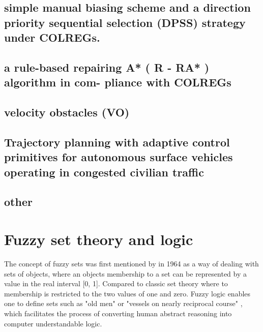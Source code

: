 \subsection{simple manual biasing scheme and a direction priority sequential selection (DPSS) strategy under COLREGs. }\cite{naeem2012colregs}
\subsection{ a rule-based repairing A* ( R - RA* ) algorithm in com-
    pliance with COLREGs }\cite{campbell2014automatic}

\subsection{velocity obstacles (VO) }\cite{kuwata2014safe}

\subsection{Trajectory planning with adaptive control primitives
    for autonomous surface vehicles operating in congested civilian traffic }\cite{shah2014trajectory}

\subsection{other } \cite{svec2013dynamics,vsvec2016adaptive,svec2012automated,svec2012usv}

\section{Fuzzy set theory and logic}
The concept of fuzzy sets was first mentioned by \textcite{zadeh1996fuzzy} in 1964 as a way of dealing with sets of objects, where an objects membership to a set can be represented by a value in the real interval [0, 1]. Compared to classic set theory where to membership is restricted to the two values of one and zero. Fuzzy logic enables one to define sets such as "old men" or "vessels on nearly reciprocal course" \cite{zadeh1996fuzzy}, which facilitates the process of converting human abstract reasoning into computer understandable logic.
